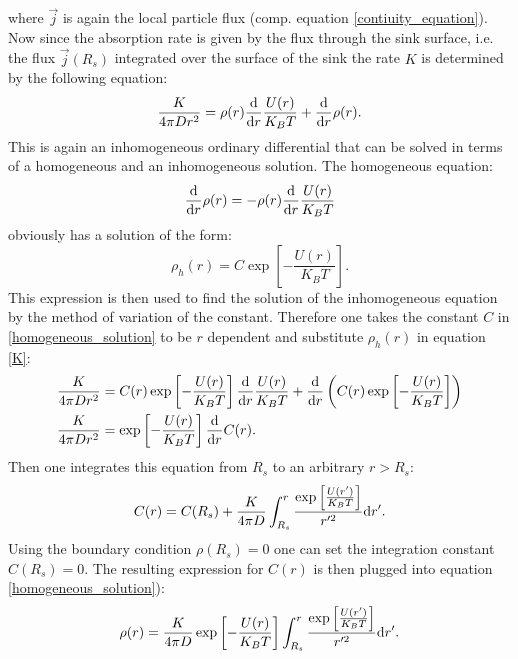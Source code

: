 where $\vec{j}$ is again the local particle flux (comp. equation \eqref{contiuity_equation}).\\ Now since the absorption rate is given by the flux through the sink surface, i.e. the flux $\vec j (R_s)$ integrated over the surface of the sink the rate $K$ is determined by the following equation:
\begin{equation}
    \frac{K}{4\pi D r^{2}} = \rho(r)\frac{\rm d}{ {\rm d}r} \frac{U(r)}{K_B T} + \frac{\rm d}{ {\rm d}r} \rho(r).
    \label{K}
\end{equation}
This is again an inhomogeneous ordinary differential that can be solved in terms of a homogeneous and an inhomogeneous solution. The homogeneous equation:
\begin{equation}
    \frac{\rm d}{{\rm d} r} \rho(r) = -\rho(r) \frac{\rm d}{ {\rm d} r} \frac{U(r)}{K_B T}
    \label{homogeneous_equation}
\end{equation}
obviously has a solution of the form:
\begin{equation}
    \rho_h(r) = C \exp \left[ - \frac{U(r)}{K_B T} \right].
    \label{homogeneous_solution}
\end{equation}
This expression is then used to find the solution of the inhomogeneous equation by the method of variation of the constant. Therefore one takes the constant $C$ in \eqref{homogeneous_solution} to be $r$ dependent and substitute $\rho_h(r)$ in equation \eqref{K}:
\begin{align}
    \frac{K}{4 \pi D r^2} &= C(r) \exp \left[ - \frac{U(r)}{K_B T} \right] \frac{\rm d}{ {\rm d} r} \frac{U(r)}{K_B T} + \frac{\rm d}{ {\rm d} r} \left( C(r) \exp \left[ - \frac{U(r)}{K_B T} \right] \right) \nonumber\\
    \frac{K}{ 4 \pi D r^2} &= \exp \left[ -\frac{U(r)}{K_B T} \right] \frac{\rm d }{ {\rm d} r} C(r).
    \label{equation_C(r)}
\end{align}
Then one integrates this equation from $R_s$ to an arbitrary $r>R_s$:
\begin{equation}
    C(r) = C(R_s) + \frac{K}{4 \pi D}\int_{R_s}^{r} \frac{\exp \left[ \frac{U(r')}{K_B T}\right]}{r'^2} {\rm d} r'.
    \label{solution_C(r)}
\end{equation}
Using the boundary condition $\rho(R_s)=0$ one can set the integration constant $C(R_s) = 0$. The resulting expression for $C(r)$ is then plugged into equation \eqref{homogeneous_solution}):
\begin{equation}
    \rho(r) = \frac{K}{4 \pi D}\exp \left[ -\frac{U(r)}{K_B T} \right] \int_{R_s}^{r} \frac{\exp \left[ \frac{U(r')}{K_B T}\right]}{r'^2} {\rm d} r'.
    \label{rho_debye}
\end{equation}
